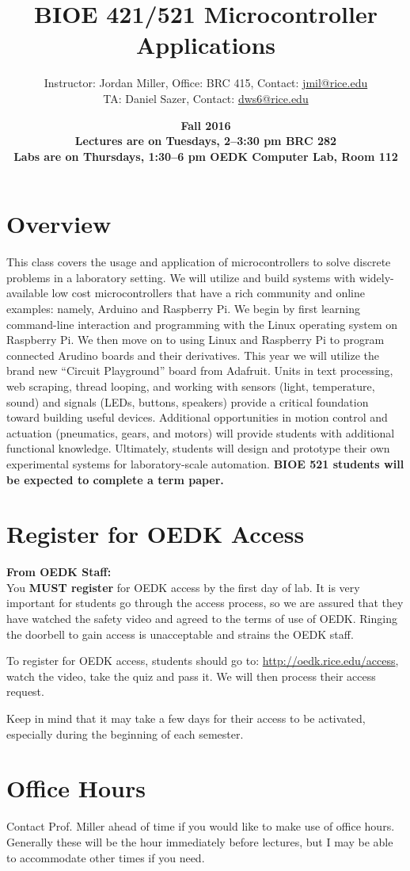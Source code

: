 \documentclass[10pt]{article}
\title{\textbf{BIOE 421/521 Microcontroller Applications}}
\date{\textbf{Fall 2016\\Lectures are on Tuesdays, 2--3:30 pm BRC 282\\Labs are on Thursdays, 1:30--6 pm OEDK Computer Lab, Room 112}}                                           %
\author{Instructor: Jordan Miller, Office: BRC 415, Contact: \href{mailto:jmil@rice.edu}{jmil@rice.edu} \\ TA: Daniel Sazer, Contact: \href{mailto:dws6@rice.edu}{dws6@rice.edu}}
\begin{document}
\maketitle

\section*{Overview}
This class covers the usage and application of microcontrollers to solve discrete problems in a laboratory setting. We will utilize and build systems with widely-available low cost microcontrollers that have a rich community and online examples: namely, Arduino and Raspberry Pi. We begin by first learning command-line interaction and programming with the Linux operating system on Raspberry Pi. We then move on to using Linux and Raspberry Pi to program connected Arudino boards and their derivatives. This year we will utilize the brand new ``Circuit Playground'' board from Adafruit. Units in text processing, web scraping, thread looping, and working with sensors (light, temperature, sound) and signals (LEDs, buttons, speakers) provide a critical foundation toward building useful devices. Additional opportunities in motion control and actuation (pneumatics, gears, and motors) will provide students with additional functional knowledge. Ultimately, students will design and prototype their own experimental systems for laboratory-scale automation. \textbf{BIOE 521 students will be expected to complete a term paper.}

\section*{Register for OEDK Access}
\textbf{From OEDK Staff:}\\
You \textbf{MUST register} for OEDK access by the first day of lab. It is very important for students go through the access process, so we are assured that they have watched the safety video and agreed to the terms of use of OEDK. Ringing the doorbell to gain access is unacceptable and strains the OEDK staff.  

To register for OEDK access, students should go to: \href{http://oedk.rice.edu/access}{http://oedk.rice.edu/access}, watch the video, take the quiz and pass it. We will then process their access request.

Keep in mind that it may take a few days for their access to be activated, especially during the beginning of each semester.

\section*{Office Hours}
Contact Prof. Miller ahead of time if you would like to make use of office hours. Generally these will be the hour immediately before lectures, but I may be able to accommodate other times if you need.
\end{document}
